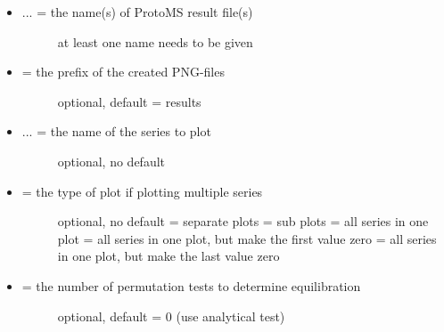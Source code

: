 \documentclass[letterpaper,10pt,english]{manual}
\begin{document}
\begin{itemize}
\item {} \begin{description}
\item[{ ... = the name(s) of ProtoMS result file(s)}] \leavevmode
at least one name needs to be given

\end{description}

\item {} \begin{description}
\item[{ = the prefix of the created PNG-files}] \leavevmode
optional, default = results

\end{description}

\item {} \begin{description}
\item[{ ... = the name of the series to plot}] \leavevmode
optional, no default

\end{description}

\item {} \begin{description}
\item[{ = the type of plot if plotting multiple series}] \leavevmode
optional, no default
 = separate plots
 = sub plots
 = all series in one plot
 = all series in one plot, but make the first value zero
 = all series in one plot, but make the last value zero

\end{description}

\item {} \begin{description}
\item[{ = the number of permutation tests to determine equilibration}] \leavevmode
optional, default = 0 (use analytical test)

\end{description}


\end{itemize}
\end{document}
